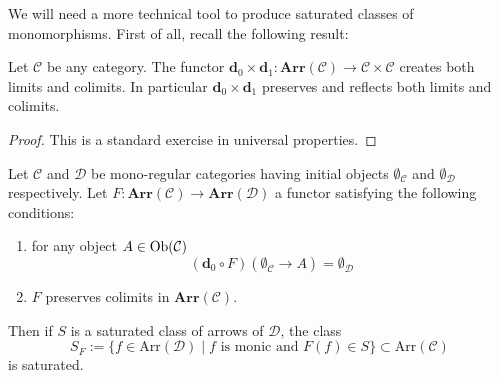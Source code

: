 We will need a more technical tool to produce saturated classes of monomorphisms. First of all, recall the following result:

\begin{lemma} \label{lemma src tgt creates}
Let $\mathcal C$ be any category. The functor $\mathbf d_0 \times \mathbf d_1 \colon \mathbf{Arr}(\mathcal C) \to \mathcal C \times \mathcal C$ creates both limits and colimits. In particular $\mathbf d_0 \times \mathbf d_1$ preserves and reflects both limits and colimits.
\end{lemma}

\begin{proof}
This is a standard exercise in universal properties.
\end{proof}

\begin{lemma} \label{lemma saturation of families}
Let $\mathcal C$ and $\mathcal D$ be mono-regular categories having initial objects $\emptyset_{\mathcal C}$ and $\emptyset_{\mathcal D}$ respectively. Let $F \colon \mathbf{Arr}( \mathcal C) \to \mathbf{Arr}(\mathcal D)$ a functor satisfying the following conditions:
\begin{enumerate}
\item for any object $A \in \mathrm{Ob}(\mathcal C)$
\[
(\mathbf d_0 \circ F)(\emptyset_{\mathcal C} \to A) = \emptyset_{\mathcal D}
\]
\item $F$ preserves colimits in $\mathbf{Arr}(\mathcal C)$.
\end{enumerate}
Then if $S$ is a saturated class of arrows of $\mathcal D$, the class
\[
S_F := \{f \in \mathrm{Arr}(\mathcal D) \mid f \text{ is monic and } F(f) \in S\} \subset \mathrm{Arr}(\mathcal C)
\]
is saturated.
\end{lemma}

